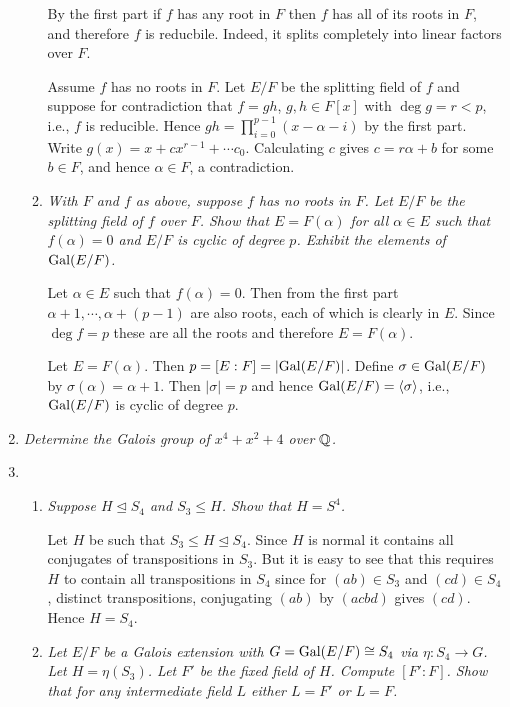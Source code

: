 \documentclass[10pt]{article}
\begin{document}
\begin{enumerate}
\begin{enumerate}
By the first part if $f$ has any root in $F$ then $f$ has all of its roots in $F$, and therefore $f$ is reducbile.  Indeed, it splits completely into linear factors over $F$.

Assume $f$ has no roots in $F$.  Let $E/F$ be the splitting field of $f$ and suppose for contradiction that $f = gh$, $g,h \in F[x]$ with $\deg g = r < p$, i.e., $f$ is reducible.  Hence $gh = \prod_{i=0}^{p-1} (x - \alpha - i)$ by the first part.  Write $g(x) = x + cx^{r-1} + \cdots c_0$.  Calculating $c$ gives $c = r\alpha + b$ for some $b \in F$, and hence $\alpha \in F$, a contradiction.

\item \emph{With $F$ and $f$ as above, suppose $f$ has no roots in $F$.  Let $E/F$ be the splitting field of $f$ over $F$.  Show that $E=F(\alpha)$ for all $\alpha \in E$ such that $f(\alpha) = 0$ and $E/F$ is cyclic of degree $p$.   Exhibit the elements of $\operatorname{Gal}(E/F)$.}

Let $\alpha \in E$ such that $f(\alpha) = 0$.  Then from the first part $\alpha+1, \cdots, \alpha+(p-1)$ are also roots, each of which is clearly in $E$.  Since $\deg f = p$ these are all the roots and therefore $E = F(\alpha)$.

Let $E = F(\alpha)$.  Then $p = [E:F] = \left| \operatorname{Gal}(E/F) \right|$.  Define $\sigma \in \operatorname{Gal}(E/F)$ by $\sigma(\alpha) = \alpha+1$.  Then $|\sigma| = p$ and hence $\operatorname{Gal}(E/F) = \left\langle \sigma \right\rangle$, i.e., $\operatorname{Gal}(E/F)$ is cyclic of degree $p$.

\end{enumerate}

\item \emph{Determine the Galois group of $x^4 + x^2 + 4$ over $\mathbb{Q}$.}



\item
\begin{enumerate}
\item \emph{Suppose $H \unlhd S_4$ and $S_3 \leq H$.  Show that $H = S^4$.}

Let $H$ be such that $S_3 \leq H \unlhd S_4$.  Since $H$ is normal it contains all conjugates of transpositions in $S_3$.  But it is easy to see that this requires $H$ to contain all transpositions in $S_4$ since for $(a b) \in S_3$ and $(c d) \in S_4$, distinct transpositions, conjugating $(a b)$ by $(a c b d)$ gives $(c d)$.  Hence $H = S_4$.

\item \emph{Let $E/F$ be a Galois extension with $G = \operatorname{Gal}(E/F) \cong S_4$ via $\eta: S_4 \rightarrow G$.  Let $H = \eta(S_3)$.  Let $F'$ be the fixed field of $H$.  Compute $[F':F]$.  Show that for any intermediate field $L$ either $L=F'$ or $L=F$.}


\end{enumerate}
\end{enumerate}
\end{document}
